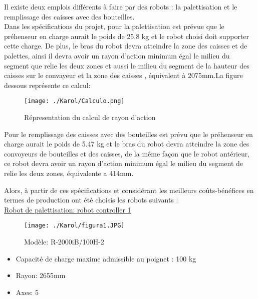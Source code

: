 Il existe deux emplois différents à faire par des robots : la palettisation et le remplissage des caisses avec des bouteilles.\\
  
Dans les spécifications du projet, pour la palettisation est prévue que le préhenseur en charge aurait le poids de 25.8 kg et le robot choisi doit supporter cette charge. De plus, le bras du robot devra atteindre la zone des caisses et de palettes, ainsi il devra avoir un rayon d’action minimum égal le milieu du segment que relie les deux zones et aussi  le milieu du segment de la hauteur des caisses sur le convayeur et la zone des caisses , équivalent à 2075mm.La figure dessous représente ce calcul: \\

\begin{figure}[H]
	\begin{center}	
		\texttt{[image: ./Karol/Calculo.png]}
		\caption{Répresentation du calcul de rayon d'action}
		\label{fig:representation}
	\end{center}
\end{figure}

Pour le remplissage des caisses avec des bouteilles est prévu que le préhenseur en charge aurait le poids de 5.47 kg et le bras du robot devra atteindre la zone des convoyeurs de bouteilles et des caisses, de la même façon que le robot antérieur, ce robot devra avoir un rayon d’action minimum égal le milieu du segment de relie les deux zones, équivalente a 414mm. 

\pagebreak
Alors, à partir de ces spécifications et considérant les meilleurs coûts-bénéfices en termes de production ont été choisis les robots suivants : \\




\underline{Robot de palettisation: robot controller 1}\\

\begin{figure}[H]
	\begin{center}	
		\texttt{[image: ./Karol/figura1.JPG]}
		\caption{Modèle: R-2000iB/100H-2}
		\label{fig:R-2000iB/100H-2}
	\end{center}
\end{figure}

\begin{itemize}
	\item Capacité de charge maxime admissible au poignet : 100 kg
	\item Rayon: 2655mm
	\item Axes: 5
\end{itemize}
\vspace{10pt}


